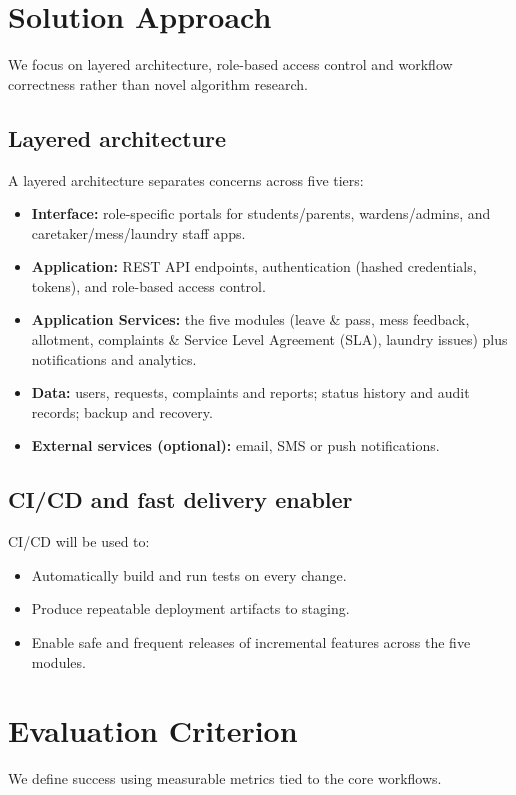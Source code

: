 \documentclass[11pt,a4paper]{article}
\begin{document}
\section{Solution Approach }
We focus on layered architecture, role-based access
control and workflow correctness rather than novel algorithm research.

\subsection{Layered architecture }
A layered architecture separates concerns across five tiers:
\begin{itemize}[leftmargin=0.7cm]
    \item \textbf{Interface:} role-specific portals for students/parents, wardens/admins, and
    caretaker/mess/laundry staff apps.
    \item \textbf{Application:} REST API endpoints, authentication (hashed credentials,
    tokens), and role-based access control.
    \item \textbf{Application Services:} the five modules (leave \& pass, mess feedback, allotment,
    complaints \& Service Level Agreement (SLA), laundry issues) plus notifications and analytics.
    \item \textbf{Data:} users, requests, complaints and reports; status history and audit
    records; backup and recovery.
    \item \textbf{External services (optional):} email, SMS or push notifications.
\end{itemize}

\subsection{CI/CD and fast delivery enabler}
CI/CD will be used to:
\begin{itemize}[leftmargin=0.7cm]
    \item Automatically build and run tests on every change.
    \item Produce repeatable deployment artifacts to staging.
    \item Enable safe and frequent releases of incremental features across the five modules.
\end{itemize}

\section{Evaluation Criterion }
We define success using measurable metrics tied to the core workflows.
\end{document}
